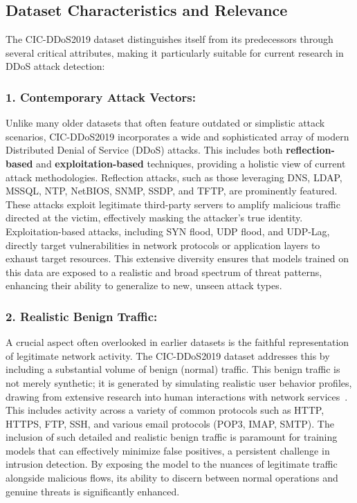 \documentclass[12pt]{report}
\begin{document}
\subsection{Dataset Characteristics and Relevance}

The CIC-DDoS2019 dataset distinguishes itself from its predecessors through several critical attributes, making it particularly suitable for current research in DDoS attack detection:

\subsubsection{1. Contemporary Attack Vectors:}

Unlike many older datasets that often feature outdated or simplistic attack scenarios, CIC-DDoS2019 incorporates a wide and sophisticated array of modern Distributed Denial of Service (DDoS) attacks. This includes both \textbf{reflection-based} and \textbf{exploitation-based} techniques, providing a holistic view of current attack methodologies. Reflection attacks, such as those leveraging DNS, LDAP, MSSQL, NTP, NetBIOS, SNMP, SSDP, and TFTP, are prominently featured. These attacks exploit legitimate third-party servers to amplify malicious traffic directed at the victim, effectively masking the attacker's true identity. Exploitation-based attacks, including SYN flood, UDP flood, and UDP-Lag, directly target vulnerabilities in network protocols or application layers to exhaust target resources. This extensive diversity ensures that models trained on this data are exposed to a realistic and broad spectrum of threat patterns, enhancing their ability to generalize to new, unseen attack types.

\subsubsection{2. Realistic Benign Traffic:}

A crucial aspect often overlooked in earlier datasets is the faithful representation of legitimate network activity. The CIC-DDoS2019 dataset addresses this by including a substantial volume of benign (normal) traffic. This benign traffic is not merely synthetic; it is generated by simulating realistic user behavior profiles, drawing from extensive research into human interactions with network services~\cite{sharafaldin2017towards}. This includes activity across a variety of common protocols such as HTTP, HTTPS, FTP, SSH, and various email protocols (POP3, IMAP, SMTP). The inclusion of such detailed and realistic benign traffic is paramount for training models that can effectively minimize false positives, a persistent challenge in intrusion detection. By exposing the model to the nuances of legitimate traffic alongside malicious flows, its ability to discern between normal operations and genuine threats is significantly enhanced.
\end{document}
